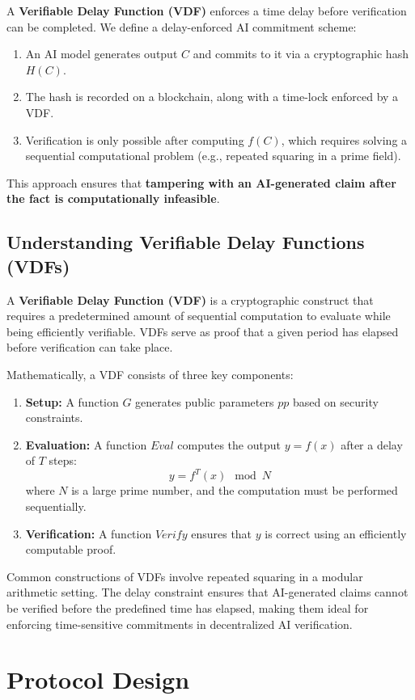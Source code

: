 \documentclass[12pt]{report}
\begin{document}
A \textbf{Verifiable Delay Function (VDF)} enforces a time delay before verification can be completed. We define a delay-enforced AI commitment scheme:
\begin{enumerate}
    \item An AI model generates output \( C \) and commits to it via a cryptographic hash \( H(C) \).
    \item The hash is recorded on a blockchain, along with a time-lock enforced by a VDF.
    \item Verification is only possible after computing \( f(C) \), which requires solving a sequential computational problem (e.g., repeated squaring in a prime field).
\end{enumerate}
This approach ensures that \textbf{tampering with an AI-generated claim after the fact is computationally infeasible}.

\subsection{Understanding Verifiable Delay Functions (VDFs)}

A \textbf{Verifiable Delay Function (VDF)} is a cryptographic construct that requires a predetermined amount of sequential computation to evaluate while being efficiently verifiable. VDFs serve as proof that a given period has elapsed before verification can take place.

Mathematically, a VDF consists of three key components:
\begin{enumerate}
    \item \textbf{Setup:} A function \( G \) generates public parameters \( pp \) based on security constraints.
    \item \textbf{Evaluation:} A function \( Eval \) computes the output \( y = f(x) \) after a delay of \( T \) steps:
    \[
    y = f^T(x) \mod N
    \]
    where \( N \) is a large prime number, and the computation must be performed sequentially.
    \item \textbf{Verification:} A function \( Verify \) ensures that \( y \) is correct using an efficiently computable proof.
\end{enumerate}
Common constructions of VDFs involve repeated squaring in a modular arithmetic setting. The delay constraint ensures that AI-generated claims cannot be verified before the predefined time has elapsed, making them ideal for enforcing time-sensitive commitments in decentralized AI verification.

\section{Protocol Design}
\end{document}

